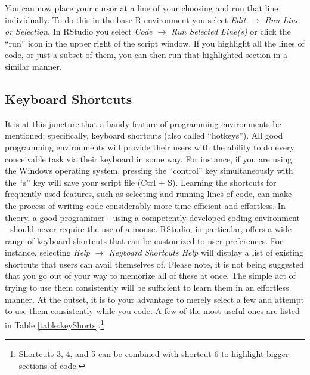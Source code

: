 \medskip

You can now place your cursor at a line of your choosing and run that line individually.  To do this in the base R environment you select \textit{Edit $\rightarrow$ Run Line or Selection}.  In RStudio you select \textit{Code $\rightarrow$ Run Selected Line(s)} or click the ``run'' icon in the upper right of the script window. If you highlight all the lines of code, or just a subset of them, you can then run that highlighted section in a similar manner.

\subsection{Keyboard Shortcuts}
\label{sec:key_short}

It is at this juncture that a handy feature of programming environments be mentioned; specifically, keyboard shortcuts (also called ``hotkeys''). All good programming environments will provide their users with the ability to do every conceivable task via their keyboard in some way. For instance, if you are using the Windows operating system, pressing the ``control'' key simultaneously with the ``s'' key will save your script file (Ctrl + S). Learning the shortcuts for frequently used features, such as selecting and running lines of code, can make the process of writing code considerably more time efficient and effortless.  In theory, a good programmer - using a competently developed coding environment - should never require the use of a mouse.  RStudio, in particular, offers a wide range of keyboard shortcuts that can be customized to user preferences.  For instance, selecting \textit{Help $\rightarrow$ Keyboard Shortcuts Help} will display a list of existing shortcuts that users can avail themselves of.  Please note, it is not being suggested that you go out of your way to memorize all of these at once. The simple act of trying to use them consistently will be sufficient to learn them in an effortless manner. At the outset, it is to your advantage to merely select a few and attempt to use them consistently while you code. A few of the most useful ones are listed in Table \ref{table:keyShorts}.\footnote{Shortcuts 3, 4, and 5 can be combined with shortcut 6 to highlight bigger sections of code.}

\vspace{1em}



